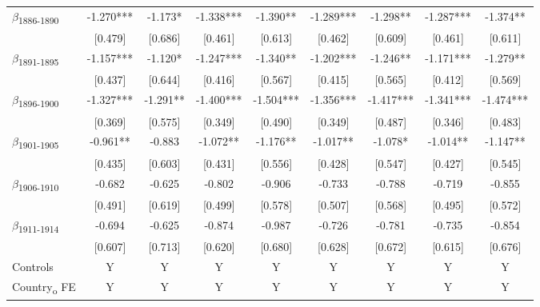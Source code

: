 {\begin{tabular}{l*{8}{c}}
$\beta$\textsubscript{1886-1890}&      -1.270***&      -1.173*  &      -1.338***&      -1.390** &      -1.289***&      -1.298** &      -1.287***&      -1.374** \\
            &     [0.479]   &     [0.686]   &     [0.461]   &     [0.613]   &     [0.462]   &     [0.609]   &     [0.461]   &     [0.611]   \\
$\beta$\textsubscript{1891-1895}&      -1.157***&      -1.120*  &      -1.247***&      -1.340** &      -1.202***&      -1.246** &      -1.171***&      -1.279** \\
            &     [0.437]   &     [0.644]   &     [0.416]   &     [0.567]   &     [0.415]   &     [0.565]   &     [0.412]   &     [0.569]   \\
$\beta$\textsubscript{1896-1900}&      -1.327***&      -1.291** &      -1.400***&      -1.504***&      -1.356***&      -1.417***&      -1.341***&      -1.474***\\
            &     [0.369]   &     [0.575]   &     [0.349]   &     [0.490]   &     [0.349]   &     [0.487]   &     [0.346]   &     [0.483]   \\
$\beta$\textsubscript{1901-1905}&      -0.961** &      -0.883   &      -1.072** &      -1.176** &      -1.017** &      -1.078*  &      -1.014** &      -1.147** \\
            &     [0.435]   &     [0.603]   &     [0.431]   &     [0.556]   &     [0.428]   &     [0.547]   &     [0.427]   &     [0.545]   \\
$\beta$\textsubscript{1906-1910}&      -0.682   &      -0.625   &      -0.802   &      -0.906   &      -0.733   &      -0.788   &      -0.719   &      -0.855   \\
            &     [0.491]   &     [0.619]   &     [0.499]   &     [0.578]   &     [0.507]   &     [0.568]   &     [0.495]   &     [0.572]   \\
$\beta$\textsubscript{1911-1914}&      -0.694   &      -0.625   &      -0.874   &      -0.987   &      -0.726   &      -0.781   &      -0.735   &      -0.854   \\
            &     [0.607]   &     [0.713]   &     [0.620]   &     [0.680]   &     [0.628]   &     [0.672]   &     [0.615]   &     [0.676]   \\
Controls    &           Y   &           Y   &           Y   &           Y   &           Y   &           Y   &           Y   &           Y   \\
Country\textsubscript{o} FE&           Y   &           Y   &           Y   &           Y   &           Y   &           Y   &           Y   &           Y   \\

\end{tabular}}
